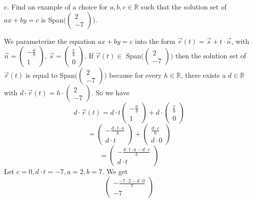 \documentclass[12pt]{article}
\newenvironment{solution}[1][Solution]
{
	\begin{trivlist} 
		\item[\hskip \labelsep {\itshape #1:}]
	}
	{
	\end{trivlist}
}
\begin{document}
\noindent
c. Find an example of a choice for $a,b,c \in \mathbb{R}$ such that the solution set of $ax +by=c$ is Span$\Bigg(\begin{pmatrix} 2 \\ -7 \end{pmatrix}\Bigg)$.
\begin{solution}
We parameterize the equation $ax +by =c$ into the form $\vec{r}(t)=\vec{s} + t \cdot \vec{n}$, with $\vec{n}=\begin{pmatrix} -\frac{a}{b} \\ {1} \end{pmatrix}$, $\vec{s} = \begin{pmatrix} \frac{c}{b} \\ 0 \end{pmatrix}$.
If $\vec{r}(t) \in$ Span$\Bigg(\begin{pmatrix} 2 \\ -7 \end{pmatrix}\Bigg)$ then the solution set of $\vec{r}(t)$ is equal to Span$\Bigg(\begin{pmatrix} 2 \\ -7 \end{pmatrix}\Bigg)$ because for every $h \in \mathbb{R}$, there exists a $d \in \mathbb{R}$ with $d \cdot \vec{r}(t) = h \cdot \begin{pmatrix} 2 \\ -7 \end{pmatrix}$. So we have
\[
d \cdot \vec{r}(t)=d \cdot t \begin{pmatrix} -\frac{a}{b} \\ {1} \end{pmatrix} + d \cdot \begin{pmatrix} \frac{c}{b} \\ 0 \end{pmatrix}
\]
\[
=\begin{pmatrix} -\frac{d \cdot t \cdot a}{b} \\ {d \cdot t} \end{pmatrix} + \begin{pmatrix} \frac{d\cdot c}{b} \\ d\cdot 0 \end{pmatrix}
\]
\[
=\begin{pmatrix} -\frac{d \cdot t \cdot a - d\cdot c}{b} \\ {d \cdot t} \end{pmatrix}
\]
Let $c=0,d \cdot t =-7, a=2,b=7$. We get
\[
\begin{pmatrix} -\frac{-7 \cdot 2 - d\cdot 0}{7} \\ {-7} \end{pmatrix}
\]
\end{solution}
\end{document}

